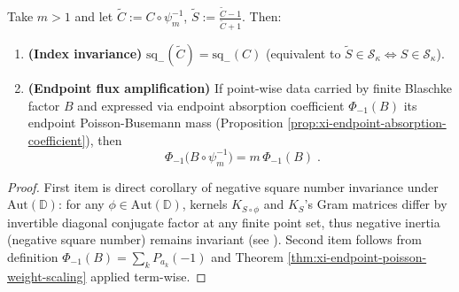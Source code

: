 \begin{theorem}\label{thm:xi-index-flux-two-laws}
Take \(m>1\) and let \(\widetilde C:=C\circ\psi_m^{-1}\), \(\widetilde S:=\frac{\widetilde C-1}{\widetilde C+1}\).
Then:
\begin{enumerate}
  \item \textbf{(Index invariance)} \(\mathrm{sq}_-(\widetilde C)=\mathrm{sq}_-(C)\) (equivalent to \(\widetilde S\in\mathcal{S}_{\kappa}\iff S\in\mathcal{S}_{\kappa}\)).
  \item \textbf{(Endpoint flux amplification)} If point-wise data carried by finite Blaschke factor \(B\) and expressed via endpoint absorption coefficient \(\Phi_{-1}(B)\) its endpoint Poisson-Busemann mass (Proposition \ref{prop:xi-endpoint-absorption-coefficient}), then
  \[
  \boxed{\;
  \Phi_{-1}\!\bigl(B\circ\psi_m^{-1}\bigr)=m\,\Phi_{-1}(B)\; }.
  \]
\end{enumerate}
\end{theorem}

\begin{proof}
First item is direct corollary of negative square number invariance under \(\mathrm{Aut}(\mathbb{D})\): for any \(\phi\in\mathrm{Aut}(\mathbb{D})\), kernels \(K_{S\circ\phi}\) and \(K_S\)'s Gram matrices differ by invertible diagonal conjugate factor at any finite point set, thus negative inertia (negative square number) remains invariant (see \cite{AlpayDijksmaRovnyakDeSnoo1997SchurPontryagin}).
Second item follows from definition \(\Phi_{-1}(B)=\sum_k P_{a_k}(-1)\) and Theorem \ref{thm:xi-endpoint-poisson-weight-scaling} applied term-wise.
\end{proof}

